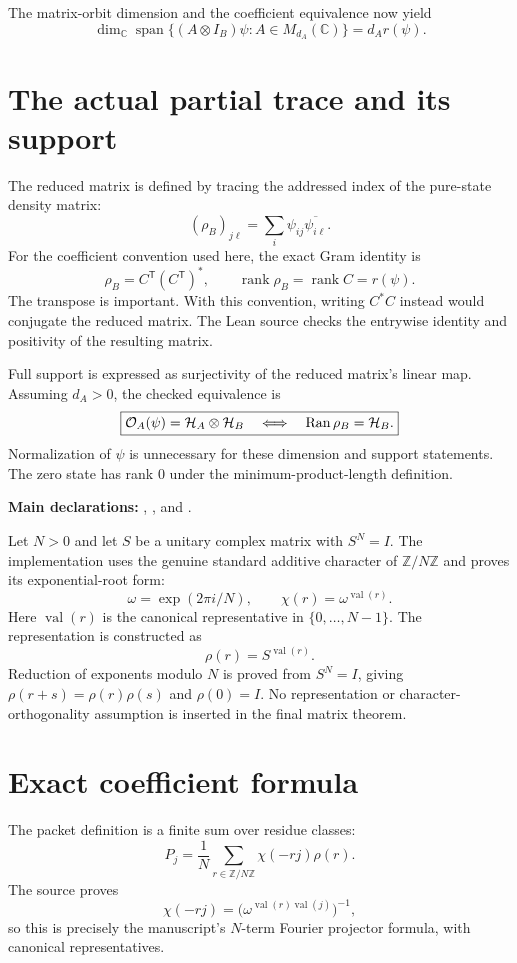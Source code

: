 \documentclass[10pt,letterpaper]{article}
\newcommand{\C}{\mathbb C}\newcommand{\R}{\mathbb R}\newcommand{\N}{\mathbb N}
\newcommand{\rank}{\operatorname{rank}}\newcommand{\spanof}{\operatorname{span}}
\newcommand{\pageheading}[2]{\vspace*{2pt}{\small\color{ink}\textsc{#1}}\par\vspace{2pt}{\Large\bfseries #2}\par\vspace{4pt}}
\begin{document}
The matrix-orbit dimension and the coefficient equivalence now yield
\[
\boxed{\dim_\C\spanof\{(A\otimes I_B)\psi:A\in M_{d_A}(\C)\}
=d_A r(\psi).}
\]

\section*{The actual partial trace and its support}
The reduced matrix is defined by tracing the addressed index of the pure-state density matrix:
\[
(\rho_B)_{j\ell}=\sum_i\psi_{ij}\overline{\psi_{i\ell}}.
\]
For the coefficient convention used here, the exact Gram identity is
\[
\rho_B=C^{\mathsf T}(C^{\mathsf T})^*,
\qquad \rank\rho_B=\rank C=r(\psi).
\]
The transpose is important. With this convention, writing $C^*C$ instead would conjugate the reduced matrix. The Lean source checks the entrywise identity and positivity of the resulting matrix.

Full support is expressed as surjectivity of the reduced matrix's linear map. Assuming $d_A>0$, the checked equivalence is
\[
\boxed{\mathcal O_A(\psi)=\mathcal H_A\otimes\mathcal H_B
\quad\Longleftrightarrow\quad \operatorname{Ran}\rho_B=\mathcal H_B.}
\]
Normalization of $\psi$ is unnecessary for these dimension and support statements. The zero state has rank $0$ under the minimum-product-length definition.

\textbf{Main declarations:} , , and .

\newpage
\pageheading{Theorem 3.1}{Constructed cyclic character projectors}
Let $N>0$ and let $S$ be a unitary complex matrix with $S^N=I$. The implementation uses the genuine standard additive character of $\mathbb Z/N\mathbb Z$ and proves its exponential-root form:
\[
\omega=\exp(2\pi i/N),\qquad
\chi(r)=\omega^{\operatorname{val}(r)}.
\]
Here $\operatorname{val}(r)$ is the canonical representative in $\{0,\ldots,N-1\}$. The representation is constructed as
\[
\rho(r)=S^{\operatorname{val}(r)}.
\]
Reduction of exponents modulo $N$ is proved from $S^N=I$, giving $\rho(r+s)=\rho(r)\rho(s)$ and $\rho(0)=I$. No representation or character-orthogonality assumption is inserted in the final matrix theorem.

\section*{Exact coefficient formula}
The packet definition is a finite sum over residue classes:
\[
P_j=\frac1N\sum_{r\in\mathbb Z/N\mathbb Z}\chi(-rj)\rho(r).
\]
The source proves
\[
\chi(-rj)=\bigl(\omega^{\operatorname{val}(r)\operatorname{val}(j)}\bigr)^{-1},
\]
so this is precisely the manuscript's $N$-term Fourier projector formula, with canonical representatives.
\end{document}
